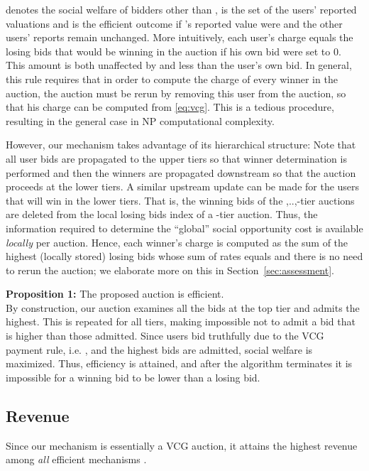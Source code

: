\documentclass[a4paper]{article}
\begin{document}
 denotes the social welfare of bidders other than ,  is the set of the
users' reported valuations and  is the efficient outcome
if 's reported value were  and the other users' reports remain
unchanged. More intuitively, each user's charge equals the
losing bids that would be winning in the auction if his own bid were set to 0. 
This amount is both unaffected by and less than the user's own bid.
In general, this rule requires that in order to compute the charge of every winner
in the auction, the auction must  be rerun by removing this user from the auction,
so that his charge can be computed from \ref{eq:vcg}. This is a tedious procedure,
resulting in the general case in NP computational complexity. 

However, our mechanism takes advantage of its hierarchical structure:  
Note that all user bids are propagated to the upper tiers so that
winner determination is performed and then the winners are propagated downstream
so that the auction proceeds at the lower tiers. A similar upstream update
can be made for the users that will win in the lower tiers. That is, 
the winning bids of the  ,..,-tier auctions are deleted from
the local losing bids index of a -tier auction. Thus, the information 
required to determine the 
``global'' social opportunity cost is available {\em locally} per auction.
Hence, each winner's  charge is computed as the sum of the highest (locally
stored) losing bids whose sum of rates equals  and 
there is no need to rerun the auction; we elaborate more on this
in Section~\ref{sec:assessment}.

{\bf Proposition 1:} The proposed auction is efficient.
\\
By construction, our auction examines all the bids
at the top tier and admits the highest. This is repeated for all tiers,
making impossible not to admit a bid that is higher than those admitted. 
Since users bid truthfully due to the VCG payment rule, i.e. ,
and the highest bids are admitted, social welfare is maximized. Thus, 
efficiency is attained,  and after the algorithm terminates it is impossible for
a winning bid to be lower than a losing bid.
\\ 

\subsection{Revenue} 
Since our mechanism is essentially a VCG auction, it attains 
the highest revenue among {\em all}
efficient mechanisms \cite{krishna}. 
\end{document}
